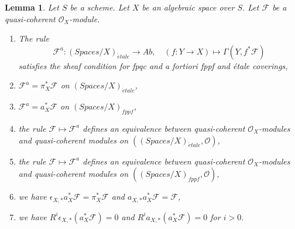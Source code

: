 \documentclass{stacks-project}
\theoremstyle{plain}
\newtheorem{lemma}[subsection]{Lemma}
\theoremstyle{definition}
\theoremstyle{remark}
\numberwithin{equation}{subsection}
\def\etale{{\acute{e}tale}}
\begin{document}
\begin{lemma}
\label{lemma-review-quasi-coherent}
Let $S$ be a scheme. Let $X$ be an algebraic space over $S$.
Let $\mathcal{F}$ be a quasi-coherent $\mathcal{O}_X$-module.
\begin{enumerate}
\item The rule
$$
\mathcal{F}^a : (\textit{Spaces}/X)_\etale \longrightarrow \textit{Ab},\quad
(f : Y \to X) \longmapsto \Gamma(Y, f^*\mathcal{F})
$$
satisfies the sheaf condition for fpqc and a fortiori
fppf and \'etale coverings,
\item $\mathcal{F}^a = \pi_X^*\mathcal{F}$ on $(\textit{Spaces}/X)_\etale$,
\item $\mathcal{F}^a = a_X^*\mathcal{F}$ on $(\textit{Spaces}/X)_{fppf}$,
\item the rule $\mathcal{F} \mapsto \mathcal{F}^a$ defines
an equivalence between quasi-coherent $\mathcal{O}_X$-modules
and quasi-coherent modules on
$((\textit{Spaces}/X)_\etale, \mathcal{O})$,
\item the rule $\mathcal{F} \mapsto \mathcal{F}^a$ defines
an equivalence between quasi-coherent $\mathcal{O}_X$-modules
and quasi-coherent modules on
$((\textit{Spaces}/X)_{fppf}, \mathcal{O})$,
\item we have $\epsilon_{X, *}a_X^*\mathcal{F} = \pi_X^*\mathcal{F}$
and $a_{X, *}a_X^*\mathcal{F} = \mathcal{F}$,
\item we have $R^i\epsilon_{X, *}(a_X^*\mathcal{F}) = 0$
and $R^ia_{X, *}(a_X^*\mathcal{F}) = 0$ for $i > 0$.
\end{enumerate}
\end{lemma}
\end{document}
